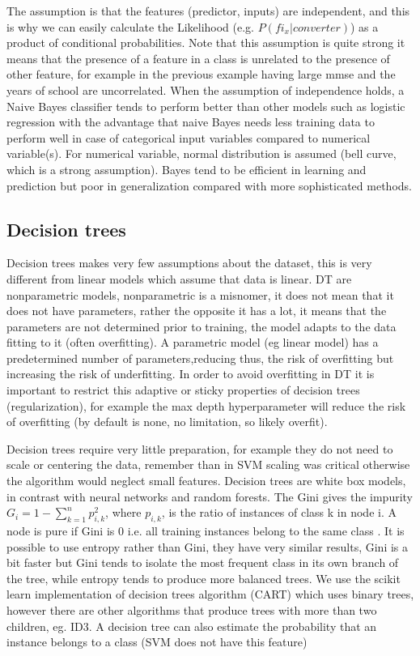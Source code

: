 \documentclass[12pt]{report}
\begin{document}
The assumption is that the features (predictor, inputs) are independent, and this is why we can easily calculate the Likelihood (e.g. $P(fi_x|converter)$) as a product of conditional probabilities. Note that this assumption is quite strong it means that the presence of a feature in a class is unrelated to the presence of other feature, for example in the previous example having large mmse and the years of school are uncorrelated.
When the assumption of independence holds, a Naive Bayes classifier tends to perform better than other models such as logistic regression with the advantage that naive Bayes needs less training data to perform well in case of categorical input variables compared to numerical variable(s). For numerical variable, normal distribution is assumed (bell curve, which is a strong assumption).
Bayes tend to be efficient in learning and prediction but poor in generalization compared with more sophisticated methods.

\subsection{Decision trees}
Decision trees makes very few assumptions about the dataset, this is very different from linear models which assume that data is linear. DT are nonparametric models, nonparametric is a misnomer, it does not mean that it does not have parameters, rather the opposite it has a lot, it means that the parameters are not determined prior to training, the model adapts to the data fitting to it (often overfitting). A parametric model (eg linear model) has a predetermined number of parameters,reducing thus, the risk of overfitting but increasing the risk of underfitting. In order to avoid overfitting in DT it is important to restrict this adaptive or sticky properties of decision trees (regularization), for example the max depth hyperparameter will reduce the risk of overfitting (by default is none, no limitation, so likely overfit).

Decision trees require very little preparation, for example they do not need to scale or centering the data, remember than in SVM scaling was critical otherwise the algorithm would neglect small features.
Decision trees are white box models, in contrast with neural networks and random forests. 
The Gini gives the impurity $G_i = 1- \sum_{k=1}^{n} p_{i,k}^2$, where $p_{i,k}$, is the ratio of instances of class k in node i. A node is pure if Gini is 0 i.e. all training instances belong to the same class . It is possible to use entropy rather than Gini, they have very similar results, Gini is a bit faster but Gini tends to isolate the most frequent class in its own branch of the tree, while entropy tends to produce more balanced trees. %
We use the scikit learn implementation of decision trees algorithm (CART) which uses binary trees, however there are other algorithms that produce trees with more than two children, eg. ID3.
A decision tree can also estimate the probability that an instance belongs to a class (SVM does not have this feature)
\end{document}
